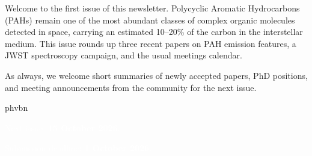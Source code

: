 \documentclass{astropah}
\newcommand{\nextissue}{15 October 2026}
\newcommand{\nextdeadline}{1 October 2026}
\begin{document}
\begin{editorial}

  Welcome to the first issue of this newsletter. Polycyclic Aromatic
  Hydrocarbons (PAHs) remain one of the most abundant classes of complex
  organic molecules detected in space, carrying an estimated 10--20\% of the
  carbon in the interstellar medium. This issue rounds up three recent
  papers on PAH emission features, a JWST spectroscopy campaign, and the
  usual meetings calendar.

  As always, we welcome short summaries of newly accepted papers, PhD
  positions, and meeting announcements from the community for the next
  issue.

\end{editorial}

\vfill

 {phv}{b}{n}
\fontsize{15}{15}
\selectfont

\begin{shaded}
  \vspace{0.1cm}
  \centerline{\textcolor{white}{Next issue: \textbf{\nextissue}.}}
  \vspace{0.2cm}
  \centerline{\textcolor{white}{Submission deadline: \textbf{\nextdeadline}.}}
  \vspace{0.1cm}
\end{shaded}

\newpage
\end{document}
